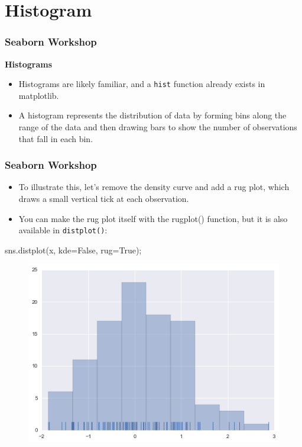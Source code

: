 \documentclass{beamer}
\begin{document}
\section{Histogram}
\begin{frame}[fragile]
	\frametitle{Seaborn Workshop}
	\Large
\noindent \textbf{Histograms}
\begin{itemize}
\item Histograms are likely familiar, and a \texttt{hist} function already exists in matplotlib. 
\item A histogram represents the distribution of data by forming bins along the range of the data and then drawing bars to show the number of observations that fall in each bin.
\end{itemize}

\end{frame}
\begin{frame}[fragile]
	\frametitle{Seaborn Workshop}
	\large
\begin{itemize}
\item To illustrate this, let’s remove the density curve and add a rug plot, which draws a small vertical tick at each observation. 
\item You can make the rug plot itself with the rugplot() function, but it is also available in \texttt{distplot()}:
\end{itemize}


sns.distplot(x, kde=False, rug=True);
\begin{figure}
\centering
\includegraphics[width=0.7\linewidth]{images/distributions_10_0}
\end{figure}

\end{frame}
\end{document}
